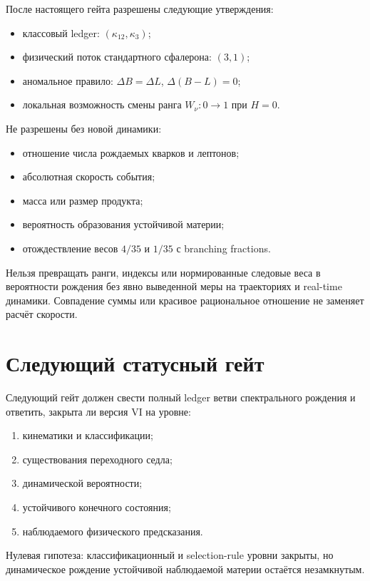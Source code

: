 После настоящего гейта разрешены следующие утверждения:
\begin{itemize}
 \item классовый ledger: $(\kappa_{12},\kappa_3)$;
 \item физический поток стандартного сфалерона: $(3,1)$;
 \item аномальное правило: $\Delta B=\Delta L$, $\Delta(B-L)=0$;
 \item локальная возможность смены ранга $W_\nu:0\to1$ при $H=0$.
\end{itemize}
Не разрешены без новой динамики:
\begin{itemize}
 \item отношение числа рождаемых кварков и лептонов;
 \item абсолютная скорость события;
 \item масса или размер продукта;
 \item вероятность образования устойчивой материи;
 \item отождествление весов $4/35$ и $1/35$ с branching fractions.
\end{itemize}

\begin{nogocriterion}
Нельзя превращать ранги, индексы или нормированные следовые веса в
вероятности рождения без явно выведенной меры на траекториях и
real-time динамики. Совпадение суммы или красивое рациональное отношение
не заменяет расчёт скорости.
\end{nogocriterion}

\section{Следующий статусный гейт}

Следующий гейт
должен свести полный ledger ветви спектрального рождения и ответить,
закрыта ли версия VI на уровне:
\begin{enumerate}
 \item кинематики и классификации;
 \item существования переходного седла;
 \item динамической вероятности;
 \item устойчивого конечного состояния;
 \item наблюдаемого физического предсказания.
\end{enumerate}

Нулевая гипотеза: классификационный и selection-rule уровни закрыты,
но динамическое рождение устойчивой наблюдаемой материи остаётся
незамкнутым.

